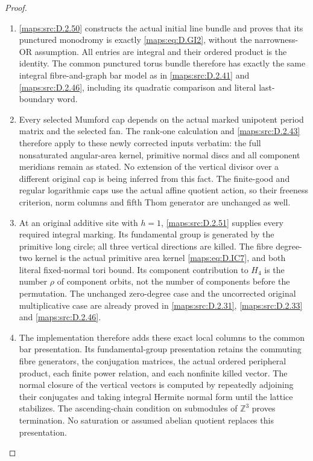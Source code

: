 \begin{proof}
\begin{enumerate}[label=\arabic*.,leftmargin=*]
\item \ref{maps:src:D.2.50} constructs the actual initial line bundle
and proves that its punctured monodromy is exactly
\eqref{maps:eq:D.GI2}, without the narrowness-OR assumption.
All entries are integral and their ordered product
is the identity. The common punctured torus bundle
therefore has exactly the same integral fibre-and-graph
bar model as in \ref{maps:src:D.2.41} and \ref{maps:src:D.2.46}, including its
quadratic comparison and literal last-boundary word.

\item Every selected Mumford cap depends on the actual
marked unipotent period matrix and the selected fan.
The rank-one calculation and \ref{maps:src:D.2.43} therefore apply
to these newly corrected inputs verbatim: the full
nonsaturated angular-area kernel, primitive normal
discs and all component meridians remain as stated.
No extension of the vertical divisor over a different
original cap is being inferred from this fact.
The finite-good and regular logarithmic caps use
the actual affine quotient action, so their freeness
criterion, norm columns and fifth Thom generator
are unchanged as well.

\item At an original additive site with $h=1$, \ref{maps:src:D.2.51}
supplies every required integral marking. Its
fundamental group is generated by the primitive
long circle; all three vertical directions are
killed. The fibre degree-two kernel is the actual
primitive area kernel \eqref{maps:eq:D.IC7}, and both literal
fixed-normal tori bound. Its component contribution
to $H_4$ is the number $\rho$ of component orbits,
not the number of components before the permutation.
The unchanged zero-degree case and the uncorrected
original multiplicative case are already proved
in \ref{maps:src:D.2.31}, \ref{maps:src:D.2.33} and \ref{maps:src:D.2.46}.

\item The implementation therefore adds these exact
local columns to the common bar presentation.
Its fundamental-group presentation retains the
commuting fibre generators, the conjugation matrices,
the actual ordered peripheral product, each finite
power relation, and each nonfinite killed vector.
The normal closure of the vertical vectors is
computed by repeatedly adjoining their conjugates
and taking integral Hermite normal form until the
lattice stabilizes. The ascending-chain condition
on submodules of $\mathbb Z^3$ proves termination.
No saturation or assumed abelian quotient replaces
this presentation.


\end{enumerate}
\end{proof}
